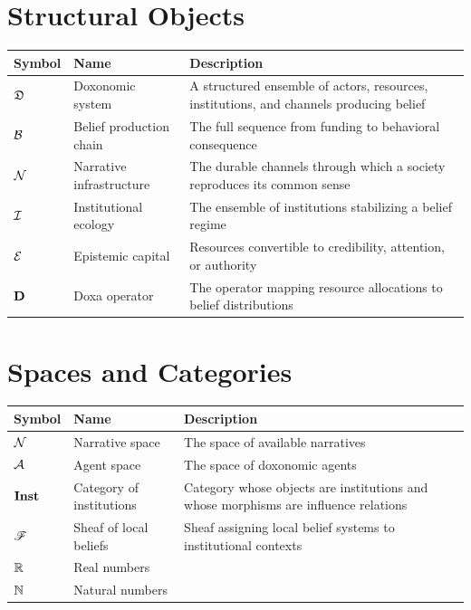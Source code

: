 \section*{Structural Objects}

\begin{longtable}{>{\raggedright}p{3cm} p{4cm} p{6.5cm}}
\toprule
\textbf{Symbol} & \textbf{Name} & \textbf{Description} \\
\midrule
\endhead
$\mathfrak{D}$ & Doxonomic system & A structured ensemble of actors, resources, institutions, and channels producing belief \\
$\mathcal{B}$ & Belief production chain & The full sequence from funding to behavioral consequence \\
$\mathcal{N}$ & Narrative infrastructure & The durable channels through which a society reproduces its common sense \\
$\mathcal{I}$ & Institutional ecology & The ensemble of institutions stabilizing a belief regime \\
$\mathcal{E}$ & Epistemic capital & Resources convertible to credibility, attention, or authority \\
$\mathbf{D}$ & Doxa operator & The operator mapping resource allocations to belief distributions \\
\bottomrule
\end{longtable}

\section*{Spaces and Categories}

\begin{longtable}{>{\raggedright}p{3cm} p{4cm} p{6.5cm}}
\toprule
\textbf{Symbol} & \textbf{Name} & \textbf{Description} \\
\midrule
\endhead
$\mathcal{N}$ & Narrative space & The space of available narratives \\
$\mathcal{A}$ & Agent space & The space of doxonomic agents \\
$\mathbf{Inst}$ & Category of institutions & Category whose objects are institutions and whose morphisms are influence relations \\
$\mathscr{F}$ & Sheaf of local beliefs & Sheaf assigning local belief systems to institutional contexts \\
$\mathbb{R}$ & Real numbers & \\
$\mathbb{N}$ & Natural numbers & \\
\bottomrule
\end{longtable}

